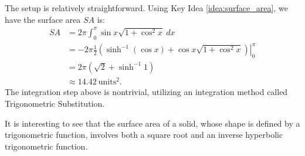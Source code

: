 {The setup is relatively straightforward. Using Key Idea \ref{idea:surface_area}, we have the surface area $SA$ is:
\begin{align*}
SA  &=	2\pi\int_0^\pi \sin x\sqrt{1+\cos^2x}\ dx \\
		&=	-2\pi\frac12\left.\left(\sinh^{-1}(\cos x)+\cos x\sqrt{1+\cos^2x}\right)\right|_0^\pi \\
		&= 2\pi\left(\sqrt{2}+\sinh^{-1} 1\right) \\
		&\approx 14.42\ \text{units}^2.
\end{align*}
The integration step above is nontrivial, utilizing an integration method called Trigonometric Substitution. 

It is interesting to see that the surface area of a solid, whose shape is defined by a trigonometric function, involves both a square root and an inverse hyperbolic trigonometric function.
}\\

